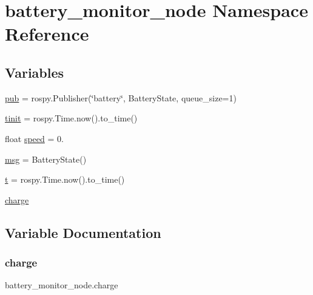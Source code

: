 \hypertarget{namespacebattery__monitor__node}{}\section{battery\+\_\+monitor\+\_\+node Namespace Reference}
\label{namespacebattery__monitor__node}
\subsection*{Variables}
\begin{DoxyCompactItemize}
\item 
\hyperlink{namespacebattery__monitor__node_ab13957b56951b692f19d70ccac2e2511}{pub} = rospy.\+Publisher(\char`\"{}battery\char`\"{}, Battery\+State, queue\+\_\+size=1)
\item 
\hyperlink{namespacebattery__monitor__node_adb6d4f12628aa05bce6384b0f89001e4}{tinit} = rospy.\+Time.\+now().to\+\_\+time()
\item 
float \hyperlink{namespacebattery__monitor__node_a78ba7243610b635b1712c5af728edc13}{speed} = 0.
\item 
\hyperlink{namespacebattery__monitor__node_ab1920c64448816edd4064e494275fdff}{msg} = Battery\+State()
\item 
\hyperlink{namespacebattery__monitor__node_a7a63d20d1ea461e280f4eb5b47f925cd}{t} = rospy.\+Time.\+now().to\+\_\+time()
\item 
\hyperlink{namespacebattery__monitor__node_af3b405948a681651077c51a9bb4181bc}{charge}
\end{DoxyCompactItemize}


\subsection{Variable Documentation}
\mbox{\label{namespacebattery__monitor__node_af3b405948a681651077c51a9bb4181bc}} 
\subsubsection{\texorpdfstring{charge}{charge}}
{\footnotesize\ttfamily battery\+\_\+monitor\+\_\+node.\+charge}



